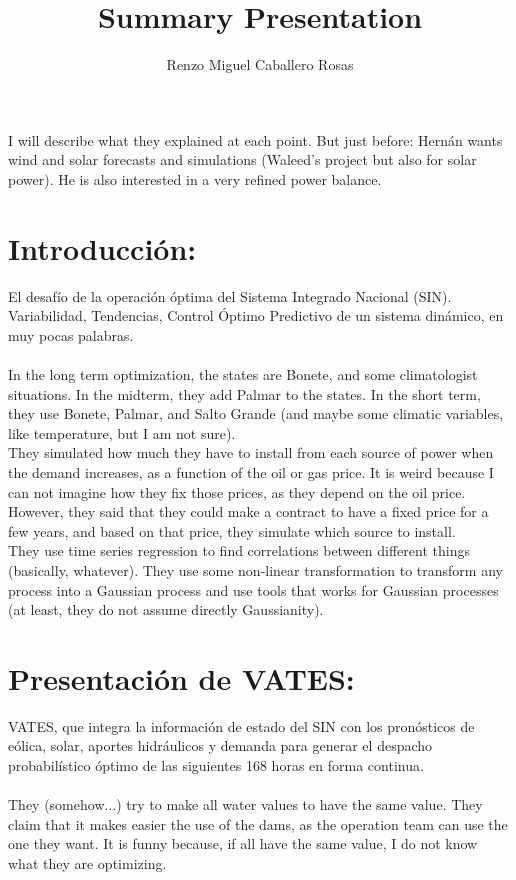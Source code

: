 \documentclass[12pt]{article}
\theoremstyle{definition}
\theoremstyle{remark}
\begin{document}
\title{Summary Presentation}
\author{Renzo Miguel Caballero Rosas} 
\maketitle

I will describe what they explained at each point. {\color{red}But just before: Hern\'an wants wind and solar forecasts and simulations (Waleed's project but also for solar power). He is also interested in a very refined power balance.}

\section*{Introducci\'on:}
El desaf\'io de la operación \'optima del Sistema Integrado Nacional (SIN).\\
Variabilidad, Tendencias, Control \'Optimo Predictivo de un sistema din\'amico, en muy pocas palabras.\\
\quad\\
{\color{blue}In the long term optimization, the states are Bonete, and some climatologist situations. In the midterm, they add Palmar to the states. In the short term, they use Bonete, Palmar, and Salto Grande (and maybe some climatic variables, like temperature, but I am not sure).\\
They simulated how much they have to install from each source of power when the demand increases, as a function of the oil or gas price. It is weird because I can not imagine how they fix those prices, as they depend on the oil price. However, they said that they could make a contract to have a fixed price for a few years, and based on that price, they simulate which source to install.\\
They use time series regression to find correlations between different things (basically, whatever). They use some non-linear transformation to transform any process into a Gaussian process and use tools that works for Gaussian processes (at least, they do not assume directly Gaussianity).}

\section*{Presentaci\'on de VATES:}
VATES, que integra la informaci\'on de estado del SIN con los pron\'osticos de e\'olica, solar, aportes hidr\'aulicos y demanda para generar el despacho probabil\'istico \'optimo de las siguientes 168 horas en forma continua.\\
\quad\\
{\color{blue} They (somehow...) try to make all water values to have the same value. They claim that it makes easier the use of the dams, as the operation team can use the one they want. It is funny because, if all have the same value, I do not know what they are optimizing.}
\end{document}
